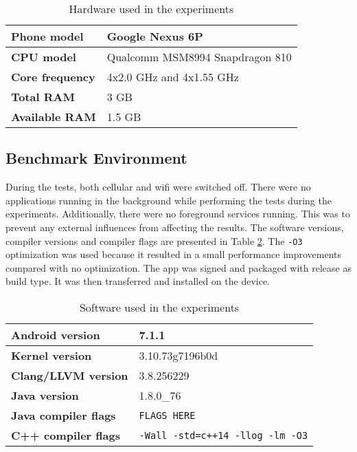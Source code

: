 \begin{table}[H]
    \centering
    \label{tab:hardware}
    \caption{Hardware used in the experiments}
    \begin{tabular}{|l|l|}
        \hline
        \textbf{Phone model} & Google Nexus 6P\\
        \hline
        \textbf{CPU model} & Qualcomm MSM8994 Snapdragon 810\\
        \hline
        \textbf{Core frequency} & 4x2.0 GHz and 4x1.55 GHz\\
        \hline
        \textbf{Total RAM} & 3 GB\\
        \hline
        \textbf{Available RAM} & 1.5 GB\\
        \hline
    \end{tabular}
\end{table}


\subsection{Benchmark Environment}
During the tests, both cellular and wifi were switched off. There were no applications running in the background while performing the tests during the experiments. Additionally, there were no foreground services running. This was to prevent any external influences from affecting the results. The software versions, compiler versions and compiler flags are presented in Table \ref{tab:software}. The \texttt{-O3} optimization was used because it resulted in a small performance improvements compared with no optimization. The app was signed and packaged with release as build type. It was then transferred and installed on the device.

\begin{table}[H]
    \centering
    \caption{Software used in the experiments}
    \begin{tabular}{|l|l|}
        \hline
        \textbf{Android version} & 7.1.1\\
        \hline
        \textbf{Kernel version} & 3.10.73g7196b0d\\
        \hline
        \textbf{Clang/LLVM version} & 3.8.256229\\
        \hline
        \textbf{Java version} & 1.8.0\_76\\
        \hline
        \textbf{Java compiler flags} & \texttt{FLAGS HERE}\\
        \hline
        \textbf{C++ compiler flags} & \texttt{-Wall -std=c++14 -llog -lm -O3}\\
        \hline
    \end{tabular}
    \label{tab:software}
\end{table}


